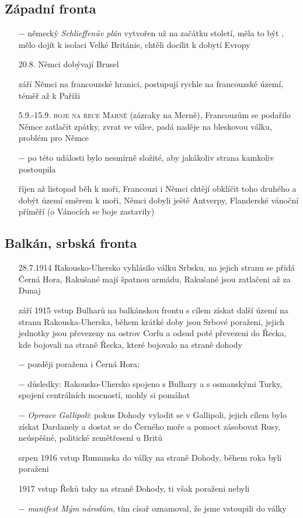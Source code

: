 \documentclass{article}
\begin{document}
\subsection*{Západní fronta}
\begin{itemize}
    \vspace{-0.5em}
    \setlength\itemsep{0.15em}
    \item[$-$] německý \textit{Schlieffenův plán} vytvořen už na začátku století, měla to být , mělo dojít k isolaci Velké Británie, chtěli docílit k dobytí Evropy
    \item[20.8.] Němci dobývají Brusel
    \item[září] Němci na francouzské hranici, postupují rychle na francouzské území, téměř až k Paříži
    \item[5.9.-15.9.] \textsc{boje na řece Marně} (zázraky na Merně), Francouzům se podařilo Němce zatlačit zpátky, zvrat ve válce, padá naděje na bleskovou válku, problém pro Němce
    \item[$-$] po této události bylo nesmírně složité, aby jakákoliv strana kamkoliv postoupila
    \item[říjen až listopad] běh k moři, Francouzi i Němci chtějí obklíčit toho druhého a dobýt území směrem k moři, Němci dobyli ještě Antverpy, Flanderské vánoční příměří (o Vánocích se boje zastavily)
\end{itemize}

\subsection*{Balkán, srbská fronta}
\begin{itemize}
    \vspace{-0.5em}
    \setlength\itemsep{0.15em}
    \item[28.7.1914] Rakousko-Uhersko vyhlásilo válku Srbsku, na jejich stranu se přidá Černá Hora, Rakušané mají špatnou armádu, Rakušané jsou zatlačeni až za Dunaj
    \item[září 1915] vstup Bulharů na balkánskou frontu s cílem získat další území na stranu Rakouska-Uherska, během krátké doby jsou Srbové poraženi, jejich jednotky jsou převezeny na ostrov Corfu a odsud poté převezeni do Řecka, kde bojovali na straně   Řecka, které bojovalo na straně dohody
    \item[$-$] později poražena i Černá Hora;
    \item[$-$] důsledky: Rakousko-Uhersko  spojeno s Bulhary a s osmanskými Turky, spojení centrálních mocností, mohly si pomáhat
    \item[$-$] \textit{Opreace Gallipoli}: pokus Dohody vylodit se v Gallipoli, jejich cílem bylo získat Dardanely a dostat se do Černého moře a pomoct zásobovat Rusy, neúspěšné, politické zemětřesení u Britů
    \item[srpen 1916] vstup Rumunska do války na straně Dohody, během roka byli poraženi
    \item[1917] vstup Řeků taky na straně Dohody, ti však poraženi nebyli
    \item[$-$] \textit{manifest Mým národům}, tím císař oznamoval, že jsme vstoupili do války
\end{itemize}
\end{document}
